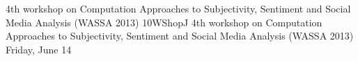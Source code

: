 \begin{wsschedule}
{4th workshop on Computation Approaches to Subjectivity, Sentiment and Social Media Analysis (WASSA 2013)}
{10}{WShopJ}
{4th workshop on Computation Approaches to Subjectivity, Sentiment and Social Media Analysis (WASSA 2013)}
{Friday, June 14}{\WShopLocJ}

\end{wsschedule}
